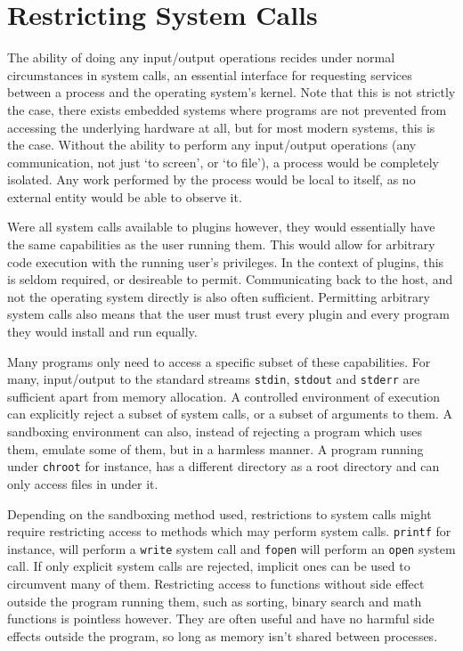 \section {Restricting System Calls}

The ability of doing any input/output operations recides under normal
circumstances in system calls, an essential interface for requesting services
between a process and the operating system's kernel.
Note that this is not strictly the case, there exists embedded systems where
programs are not prevented from accessing the underlying hardware at all, but
for most modern systems, this is the case.
Without the ability to perform any input/output operations (any communication,
not just `to screen', or `to file'), a process would be completely isolated.
Any work performed by the process would be local to itself, as no external
entity would be able to observe it.

Were all system calls available to plugins however, they would essentially
have the same capabilities as the user running them.
This would allow for arbitrary code execution with the running user's
privileges.
In the context of plugins, this is seldom required, or desireable to permit.
Communicating back to the host, and not the operating system directly is also
often sufficient.
Permitting arbitrary system calls also means that the user must trust every
plugin and every program they would install and run equally.

Many programs only need to access a specific subset of these capabilities.
For many, input/output to the standard streams \texttt{stdin}, \texttt{stdout}
and \texttt{stderr} are sufficient apart from memory allocation.
A controlled environment of execution can explicitly reject a subset of system
calls, or a subset of arguments to them.
A sandboxing environment can also, instead of rejecting a program which uses
them, emulate some of them, but in a harmless manner.
A program running under \texttt{chroot} for instance, has a different directory
as a root directory and can only access files in under it.

Depending on the sandboxing method used, restrictions to system calls might
require restricting access to methods which may perform system calls.
\texttt{printf} for instance, will perform a \texttt{write} system call and
\texttt{fopen} will perform an \texttt{open} system call.
If only explicit system calls are rejected, implicit ones can be used to
circumvent many of them.
Restricting access to functions without side effect outside the program running
them, such as sorting, binary search and math functions is pointless however.
They are often useful and have no harmful side effects outside the program, so
long as memory isn't shared between processes.

